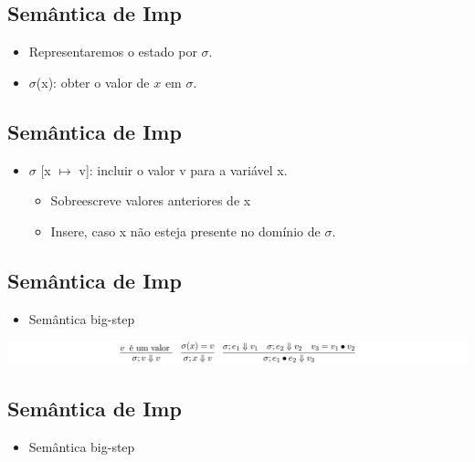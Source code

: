 \documentclass[11pt]{article}
\begin{document}
\subsection*{Semântica de Imp}
\label{sec:orge39470d}

\begin{itemize}
\item Representaremos o estado por \(\sigma\).

\item \(\sigma\)(x): obter o valor de \(x\) em \(\sigma\).
\end{itemize}
\subsection*{Semântica de Imp}
\label{sec:org58276ca}

\begin{itemize}
\item \(\sigma\) [x \(\mapsto\) v]: incluir o valor v para a variável x.
\begin{itemize}
\item Sobreescreve valores anteriores de x
\item Insere, caso x não esteja presente no domínio de \(\sigma\).
\end{itemize}
\end{itemize}
\subsection*{Semântica de Imp}
\label{sec:orge140146}

\begin{itemize}
\item Semântica big-step
\end{itemize}

\begin{center}
\includegraphics[width=.9\linewidth]{./imgs/image1.png}
\end{center}
\subsection*{Semântica de Imp}
\label{sec:orgdd936c0}

\begin{itemize}
\item Semântica big-step
\end{itemize}
\end{document}
